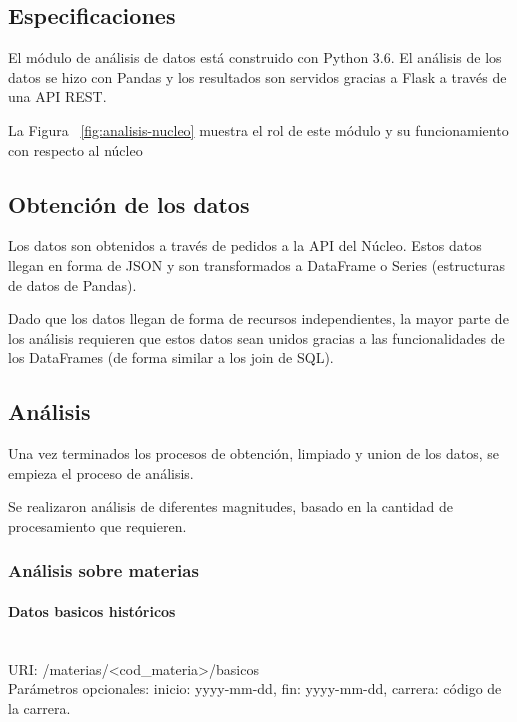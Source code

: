 \subsection{Especificaciones}

El módulo de análisis de datos está construido con Python 3.6. El análisis de los datos se hizo con Pandas y los resultados son servidos gracias a Flask a través de una API REST.


La Figura ~\ref{fig:analisis-nucleo} muestra el rol de este módulo y su funcionamiento con respecto al núcleo


\subsection{Obtención de los datos}

Los datos son obtenidos a través de pedidos a la API del Núcleo. Estos datos llegan en forma de JSON y son transformados a DataFrame o Series (estructuras de datos de Pandas). 

Dado que los datos llegan de forma de recursos independientes, la mayor parte de los análisis requieren que estos datos sean unidos gracias a las funcionalidades de los DataFrames (de forma similar a los join de SQL).

\subsection{Análisis}

Una vez terminados los procesos de obtención, limpiado y union de los datos, se empieza el proceso de análisis.

Se realizaron análisis de diferentes magnitudes, basado en la cantidad de procesamiento que requieren. 
\subsubsection{Análisis sobre materias}

\paragraph{Datos basicos históricos} \mbox{}\\

URI: /materias/<cod\_materia>/basicos \\

Parámetros opcionales: inicio: yyyy-mm-dd, fin: yyyy-mm-dd, carrera: código de la carrera. \\

